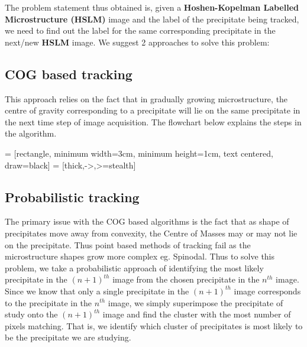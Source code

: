 \documentclass[12pt, a4paper]{report}
\begin{document}
The problem statement thus obtained is, given a \textbf{Hoshen-Kopelman Labelled Microstructure (HSLM)} image and the label of the precipitate being tracked, we need to find out the label for the same corresponding precipitate in the next/new \textbf{HSLM} image. We suggest 2 approaches to solve this problem:

\subsection{COG based tracking}
This approach relies on the fact that in gradually growing microstructure, the centre of gravity corresponding to a precipitate will lie on the same precipitate in the next time step of image acquisition. The flowchart below explains the steps in the algorithm.

\usetikzlibrary{shapes.geometric, arrows}
 = [rectangle, minimum width=3cm, minimum height=1cm, text centered, draw=black]
 = [thick,->,>=stealth]
\begin{center}
\end{center}

\subsection{Probabilistic tracking}
The primary issue with the COG based algorithms is the fact that as shape of precipitates move away from convexity, the Centre of Masses may or may not lie on the precipitate. Thus point based methods of tracking fail as the microstructure shapes grow more complex eg. Spinodal. Thus to solve this problem, we take a probabilistic approach of identifying the most likely precipitate in the ${(n+1)}^{th}$ image from the chosen precipitate in the $n^{th}$ image. Since we know that only a single precipitate in the ${(n+1)}^{th}$ image corresponds to the precipitate in the $n^{th}$ image, we simply superimpose the precipitate of study onto the ${(n+1)}^{th}$ image and find the cluster with the most number of pixels matching. That is, we identify which cluster of precipitates is most likely to be the precipitate we are studying.
\end{document}
